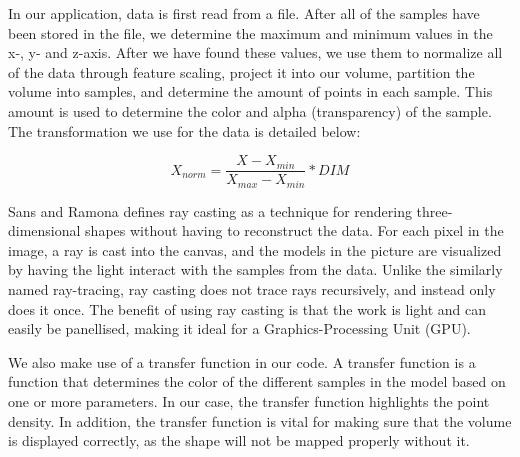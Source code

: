 \documentclass[a4paper,12pt]{extarticle}
\begin{document}
In our application, data is first read from a file. After all of the samples have been stored in the file, we determine the maximum and minimum values in the x-, y- and z-axis. After we have found these values, we use them to normalize all of the data through feature scaling, project it into our volume, partition the volume into samples, and determine the amount of points in each sample. This amount is used to determine the color and alpha (transparency) of the sample. The transformation we use for the data is detailed below:

$$ X_{norm} = \frac{X - X_{min}}{X_{max}-X_{min}} * DIM$$

Sans and Ramona \cite{san_2017} defines ray casting as a technique for rendering three-dimensional shapes without having to reconstruct the data. For each pixel in the image, a ray is cast into the canvas, and the models in the picture are visualized by having the light interact with the samples from the data. Unlike the similarly named ray-tracing, ray casting does not trace rays recursively, and instead only does it once. The benefit of using ray casting is that the work is light and can easily be panellised, making it ideal for a Graphics-Processing Unit (GPU).

We also make use of a transfer function in our code. A transfer function is a function that determines the color of the different samples in the model based on one or more parameters. In our case, the transfer function highlights the point density. In addition, the transfer function is vital for making sure that the volume is displayed correctly, as the shape will not be mapped properly without it.


\end{document}
